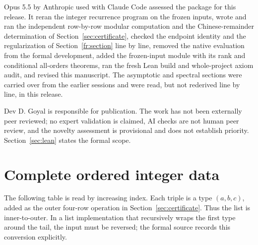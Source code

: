 \documentclass[11pt]{article}
\theoremstyle{remark}\newtheorem{remark}[theorem]{Remark}
\begin{document}
Opus 5.5 by Anthropic used with Claude Code assessed the package for
this release. It reran the integer recurrence program on the frozen
inputs, wrote and ran the independent row-by-row modular computation
and the Chinese-remainder determination of Section~\ref{sec:certificate},
checked the endpoint identity and the regularization of
Section~\ref{fr:section} line by line, removed the native evaluation
from the formal development, added the frozen-input module with its
rank and conditional all-orders theorems, ran the fresh Lean build and
whole-project axiom audit, and revised this manuscript. The asymptotic
and spectral sections were carried over from the earlier sessions and
were read, but not rederived line by line, in this release.

Dev D. Goyal is responsible for publication. The work has not been
externally peer reviewed; no expert validation is claimed, AI checks are
not human peer review, and the novelty assessment is provisional and
does not establish priority. Section~\ref{sec:lean} states the formal
scope.

\appendix
\section{Complete ordered integer data}\label{app:data}

The following table is read by increasing index. Each triple is a type
$(a,b,c)$, added as the outer four-row operation in
Section~\ref{sec:certificate}. Thus the list is inner-to-outer. In a
list implementation that recursively wraps the first type around the
tail, the input must be reversed; the formal source records this
conversion explicitly.



{\small\raggedright}
\end{document}
